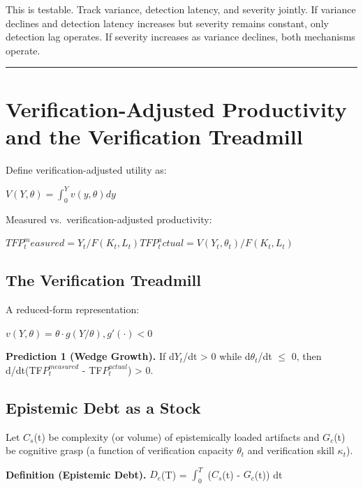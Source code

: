 \documentclass[11pt,a4paper]{article}
\begin{document}
This is testable. Track variance, detection latency, and severity jointly. If variance declines and detection latency increases but severity remains constant, only detection lag operates. If severity increases as variance declines, both mechanisms operate.

\begin{center}\rule{0.5\linewidth}{0.5pt}\end{center}

\hypertarget{verification-adjusted-productivity-and-the-verification-treadmill}{%
\section{Verification-Adjusted Productivity and the Verification Treadmill}\label{verification-adjusted-productivity-and-the-verification-treadmill}}

Define verification-adjusted utility as:

$V(Y, \theta) = \int_0^Y v(y, \theta) dy$

Measured vs.~verification-adjusted productivity:

$TFP_t^measured = Y_t / F(K_t, L_t) TFP_t^actual = V(Y_t, \theta_t) / F(K_t, L_t)$

\hypertarget{the-verification-treadmill}{%
\subsection{ The Verification Treadmill}\label{the-verification-treadmill}}

A reduced-form representation:

$v(Y, \theta) = \theta \cdot g(Y/\theta), g'(\cdot) < 0$

\textbf{Prediction 1 (Wedge Growth).} If d$Y_t$/dt > 0 while d$\theta_{t}$/dt $\leq$ 0, then d/dt(TF$P_t^{measured}$ - TF$P_t^{actual}$) > 0.

\hypertarget{epistemic-debt-as-a-stock}{%
\subsection{ Epistemic Debt as a Stock}\label{epistemic-debt-as-a-stock}}

Let $C_s$(t) be complexity (or volume) of epistemically loaded artifacts and $G_c$(t) be cognitive grasp (a function of verification capacity $\theta_{t}$ and verification skill $\kappa_{t}$).

\textbf{Definition (Epistemic Debt).} $D_e$(T) = $\int_0^{T}$ ($C_s$(t) - $G_c$(t)) dt
\end{document}
